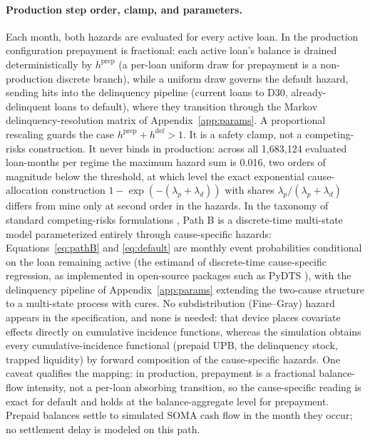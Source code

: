 \documentclass[12pt]{article}
\begin{document}
\paragraph{Production step order, clamp, and parameters.}
Each month, both hazards are evaluated for every active loan. In the production configuration prepayment is fractional: each active loan's balance is drained deterministically by $h^{\mathrm{prep}}$ (a per-loan uniform draw for prepayment is a non-production discrete branch), while a uniform draw governs the default hazard, sending hits into the delinquency pipeline (current loans to D30, already-delinquent loans to default), where they transition through the Markov delinquency-resolution matrix of Appendix~\ref{app:params}. A proportional rescaling guards the case $h^{\mathrm{prep}} + h^{\mathrm{def}} > 1$. It is a safety clamp, not a competing-risks construction. It never binds in production: across all 1,683,124 evaluated loan-months per regime the maximum hazard sum is 0.016, two orders of magnitude below the threshold, at which level the exact exponential cause-allocation construction $1-\exp(-(\lambda_p+\lambda_d))$ with shares $\lambda_p/(\lambda_p+\lambda_d)$ differs from mine only at second order in the hazards. In the taxonomy of standard competing-risks formulations \citep{putter2007}, Path B is a discrete-time multi-state model parameterized entirely through cause-specific hazards: Equations~\eqref{eq:pathB} and \eqref{eq:default} are monthly event probabilities conditional on the loan remaining active (the estimand of discrete-time cause-specific regression, as implemented in open-source packages such as PyDTS \citep{meir2025}), with the delinquency pipeline of Appendix~\ref{app:params} extending the two-cause structure to a multi-state process with cures. No subdistribution (Fine--Gray) hazard \citep{fine1999} appears in the specification, and none is needed: that device places covariate effects directly on cumulative incidence functions, whereas the simulation obtains every cumulative-incidence functional (prepaid UPB, the delinquency stock, trapped liquidity) by forward composition of the cause-specific hazards. One caveat qualifies the mapping: in production, prepayment is a fractional balance-flow intensity, not a per-loan absorbing transition, so the cause-specific reading is exact for default and holds at the balance-aggregate level for prepayment. Prepaid balances settle to simulated SOMA cash flow in the month they occur; no settlement delay is modeled on this path.
\end{document}
